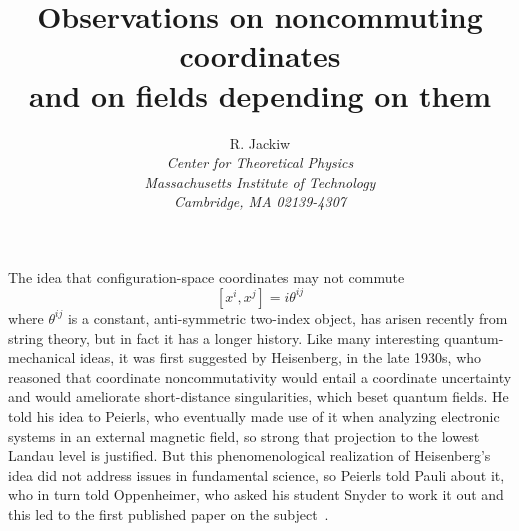 \documentclass[a4paper,12pt,twoside]{article}
\newcommand{\numeq}[2]{\begin{equation}
#2
\label{#1}
\end{equation}}
\begin{document}
 
\title{Observations on noncommuting coordinates\\ and on fields depending on them}
\author{R. Jackiw\\
\small\it Center for Theoretical Physics\\ 
\small\it Massachusetts Institute of Technology\\ 
\small\it Cambridge, MA 02139-4307}

\date{\vspace*{-.25in}}

\maketitle




\pagestyle{myheadings}
\thispagestyle{empty}


\section*{}


The idea that configuration-space coordinates may not commute
\numeq{e1}{
[x^i, x^j] = i\theta^{ij}
}
where $\theta^{ij}$ is a constant, anti-symmetric two-index object, has arisen recently from
string theory, but in fact it has a longer history.  Like many interesting quantum-mechanical
ideas, it was first suggested  by Heisenberg, in the late 1930s, who reasoned that coordinate
noncommutativity would entail a coordinate uncertainty and would ameliorate short-distance
singularities, which beset quantum fields. He told  his idea to Peierls, who eventually made use
of it when analyzing electronic systems in an external magnetic field, so strong that projection
to the lowest Landau level is justified.   But this phenomenological realization of
Heisenberg's idea did not address  issues in fundamental science, so Peierls told Pauli about
it, who in turn told Oppenheimer, who  asked his student Snyder to work it out and this  led to
the first published paper on the subject~\cite{r1}. 
\end{document}
